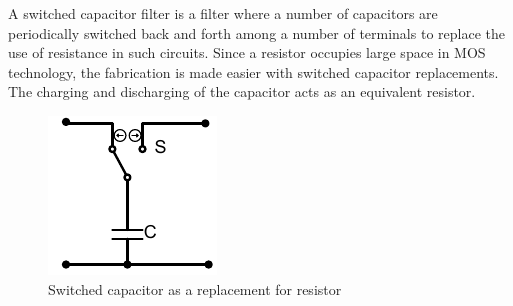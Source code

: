 A switched capacitor filter is a filter where a number of capacitors are periodically switched back and forth among a number of terminals to replace the use of resistance in such circuits. Since a resistor occupies large space in MOS technology, the fabrication is made easier with switched capacitor replacements. The charging and discharging of the capacitor acts as an equivalent resistor.

\begin{figure}[H]
\centering
\includegraphics[scale=1.5]{../Figures/switched_cap}
\caption{Switched capacitor as a replacement for resistor}
\label{fig:switched}
\end{figure}

